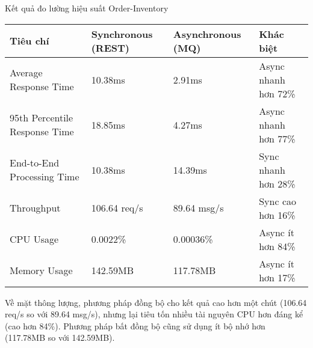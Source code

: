 \begin{table}[h]{Kết quả đo lường hiệu suất Order-Inventory}
    \centering
    {\setlength{\arrayrulewidth}{1pt}
        \renewcommand{\arraystretch}{1.5}
        \setlength{\tabcolsep}{6pt}
        \begin{tabular}{|p{3.2cm}|p{3.2cm}|p{3.2cm}|p{3.2cm}|}
            \hline
            \textbf{Tiêu chí}             & \textbf{Synchronous (REST)} & \textbf{Asynchronous (MQ)} & \textbf{Khác biệt}   \\
            \hline
            Average Response Time         & 10.38ms                     & 2.91ms                     & Async nhanh hơn 72\% \\
            \hline
            95th Percentile Response Time & 18.85ms                     & 4.27ms                     & Async nhanh hơn 77\% \\
            \hline
            End-to-End Processing Time    & 10.38ms                     & 14.39ms                    & Sync nhanh hơn 28\%  \\
            \hline
            Throughput                    & 106.64 req/s                & 89.64 msg/s                & Sync cao hơn 16\%    \\
            \hline
            CPU Usage                     & 0.0022\%                    & 0.00036\%                  & Async ít hơn 84\%    \\
            \hline
            Memory Usage                  & 142.59MB                    & 117.78MB                   & Async ít hơn 17\%    \\
            \hline
        \end{tabular}}
\end{table}

Về mặt thông lượng, phương pháp đồng bộ cho kết quả cao hơn một chút (106.64 req/s so với 89.64 msg/s), nhưng lại tiêu tốn nhiều tài nguyên CPU hơn đáng kể (cao hơn 84\%). Phương pháp bất đồng bộ cũng sử dụng ít bộ nhớ hơn (117.78MB so với 142.59MB).


